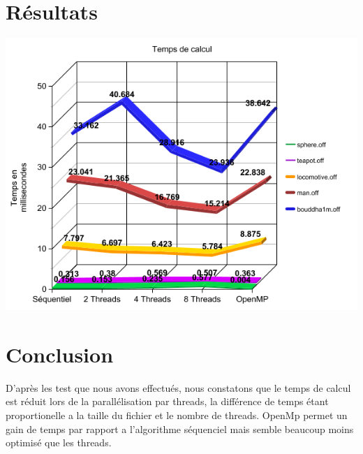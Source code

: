 \documentclass[a4paper]{article}
\begin{document}
\section{Résultats}
	\begin{center}
		\includegraphics[scale = 0.7]{graph_execTime_machine1.png}
	\end{center}
\section{Conclusion}
D'après les test que nous avons effectués, nous constatons que le temps de calcul est réduit lors de la parallélisation par threads, la différence de temps étant proportionelle a la taille du fichier et le nombre de threads.
OpenMp permet un gain de temps par rapport a l'algorithme séquenciel mais semble beaucoup moins optimisé que les threads.

\newpage


\end{document}
